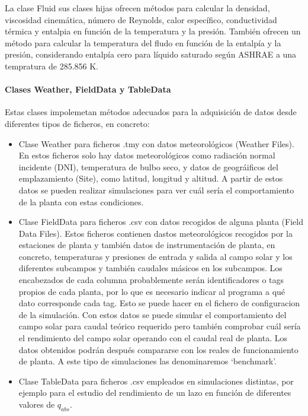 La clase Fluid sus clases hijas ofrecen métodos para calcular la
densidad, viscosidad cinemática, número de Reynolds, calor específico,
conductividad térmica y entalpia en función de la temperatura y la
presión. También ofrecen un método para calcular la temperatura del
fludo en función de la entalpía y la presión, considerando entalpía cero
para líquido saturado según ASHRAE a una tempratura de 285.856 K.

\hypertarget{clases-weather-fielddata-y-tabledata}{%
\paragraph{Clases Weather, FieldData y
TableData}\label{clases-weather-fielddata-y-tabledata}}

Estas clases impolemetan métodos adecuados para la adquisición de datos
desde diferentes tipos de ficheros, en concreto:

\begin{itemize}
\tightlist
\item
  Clase Weather para ficheros .tmy con datos meteorológicos (Weather
  Files). En estos ficheros solo hay datos meteorológicos como radiación
  normal incidente (DNI), temperatura de bulbo seco, y datos de
  geográificos del emplazamiento (Site), como latitud, longitud y
  altitud. A partir de estos datos se pueden realizar simulaciones para
  ver cuál sería el comportamiento de la planta con estas condiciones.
\item
  Clase FieldData para ficheros .csv con datos recogidos de alguna
  planta (Field Data Files). Estos ficheros contienen dastos
  meteorológicos recogidos por la estaciones de planta y también datos
  de instrumentación de planta, en concreto, temperaturas y presiones de
  entrada y salida al campo solar y los diferentes subcampos y también
  caudales másicos en los subcampos. Los encabezados de cada columna
  probablemente serán identificadores o tags propios de cada planta, por
  lo que es necesario indicar al programa a qué dato corresponde cada
  tag. Esto se puede hacer en el fichero de configuracion de la
  simulación. Con estos datos se puede simular el comportamiento del
  campo solar para caudal teórico requerido pero también comprobar cuál
  sería el rendimiento del campo solar operando con el caudal real de
  planta. Los datos obtenidos podrán después compararse con los reales
  de funcionamiento de planta. A este tipo de simulaciones las
  denominaremos `benchmark'.
\item
  Clase TableData para ficheros .csv empleados en simulaciones
  distintas, por ejemplo para el estudio del rendimiento de un lazo en
  función de diferentes valores de \(q_{abs}\).
\end{itemize}

